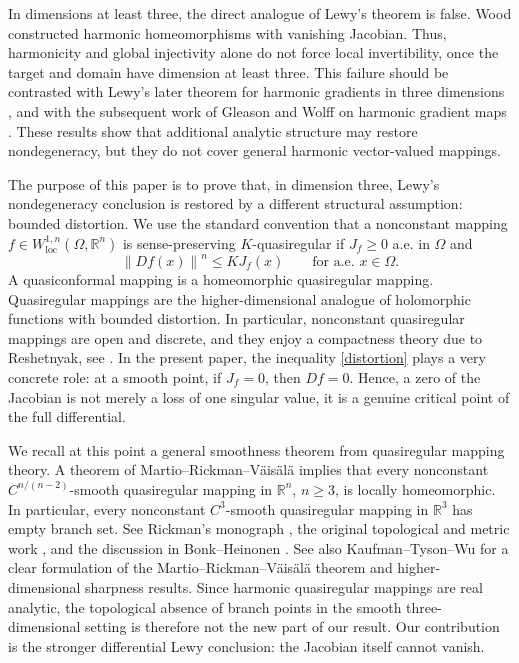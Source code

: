 \documentclass[10pt]{amsart}
\numberwithin{equation}{section}
\theoremstyle{definition}
\newcommand{\R}{\mathbb R}
\newcommand{\norm}[1]{\left\|#1\right\|}
\begin{document}
In dimensions at least three, the direct analogue of Lewy's theorem is false.
Wood \cite{Wood1991} constructed harmonic homeomorphisms with vanishing
Jacobian. Thus, harmonicity and global injectivity alone do not force local
invertibility, once the target and domain have dimension at least three. This
failure should be contrasted with Lewy's later theorem for harmonic gradients
in three dimensions \cite{Lewy1968}, and with the subsequent work of Gleason
and Wolff on harmonic gradient maps \cite{GleasonWolff}. These results show
that additional analytic structure may restore nondegeneracy, but they do not
cover general harmonic vector-valued mappings.

The purpose of this paper is to prove that, in dimension three, Lewy's
nondegeneracy conclusion is restored by a different structural assumption:
bounded distortion. We use the standard convention that a nonconstant mapping
\(f\in W^{1,n}_{\operatorname{loc}}(\Omega,\R^n)\) is sense-preserving
\(K\)-quasiregular if \(J_f\ge0\) a.e. in $\Omega$ and
\begin{equation}\label{distortion}
        \norm{Df(x)}^n\le KJ_f(x)
        \qquad\text{for a.e. }x\in\Omega .
\end{equation}
A quasiconformal mapping is a homeomorphic quasiregular mapping. Quasiregular
mappings are the higher-dimensional analogue of holomorphic functions with
bounded distortion. In particular, nonconstant quasiregular mappings are open
and discrete, and they enjoy a compactness theory due to Reshetnyak, see
\cite{Reshetnyak,Rickman,Vaisala}. In the present paper, the inequality
\eqref{distortion} plays a very concrete role: at a smooth point, if
\(J_f=0\), then \(Df=0\). Hence, a zero of the Jacobian is not merely a loss of
one singular value, it is a genuine critical point of the full differential.

We recall at this point a general smoothness theorem from quasiregular mapping
theory. A theorem of Martio--Rickman--V\"ais\"al\"a implies that every
nonconstant \(C^{n/(n-2)}\)-smooth quasiregular mapping in \(\R^n\),
\(n\ge3\), is locally homeomorphic. In particular, every nonconstant
\(C^3\)-smooth quasiregular mapping in \(\R^3\) has empty branch set. See
Rickman's monograph \cite[p. 12]{Rickman}, the original topological and metric
work \cite{MRV}, and the discussion in Bonk--Heinonen \cite{BonkHeinonen}. See
also Kaufman--Tyson--Wu \cite{KaufmanTysonWu} for a clear formulation of the
Martio--Rickman--V\"ais\"al\"a theorem and higher-dimensional sharpness results.
Since harmonic quasiregular mappings are real analytic, the topological
absence of branch points in the smooth three-dimensional setting is therefore
not the new part of our result. Our contribution is the stronger differential
Lewy conclusion: the Jacobian itself cannot vanish.
\end{document}
